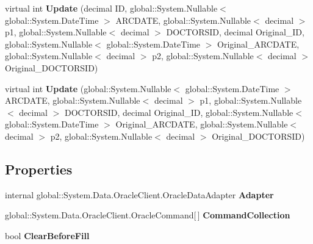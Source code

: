 \begin{CompactItemize}
\item 
virtual int \textbf{Update} (decimal ID, global::System.Nullable$<$ global::System.DateTime $>$ ARCDATE, global::System.Nullable$<$ decimal $>$ p1, global::System.Nullable$<$ decimal $>$ DOCTORSID, decimal Original\_\-ID, global::System.Nullable$<$ global::System.DateTime $>$ Original\_\-ARCDATE, global::System.Nullable$<$ decimal $>$ p2, global::System.Nullable$<$ decimal $>$ Original\_\-DOCTORSID)\label{class_automatic_medical_system_1_1_data_set2_table_adapters_1_1_a_r_c___s_p___d_o_c_t_o_r___r_e_c_o_r_d_s_table_adapter_15d0b9067ab3222469e34572e87bdfb9}

\item 
virtual int \textbf{Update} (global::System.Nullable$<$ global::System.DateTime $>$ ARCDATE, global::System.Nullable$<$ decimal $>$ p1, global::System.Nullable$<$ decimal $>$ DOCTORSID, decimal Original\_\-ID, global::System.Nullable$<$ global::System.DateTime $>$ Original\_\-ARCDATE, global::System.Nullable$<$ decimal $>$ p2, global::System.Nullable$<$ decimal $>$ Original\_\-DOCTORSID)\label{class_automatic_medical_system_1_1_data_set2_table_adapters_1_1_a_r_c___s_p___d_o_c_t_o_r___r_e_c_o_r_d_s_table_adapter_5041dff5a8efb7e228ba881403b568c9}

\end{CompactItemize}
\subsection*{Properties}
\begin{CompactItemize}
\item 
internal global::System.Data.OracleClient.OracleDataAdapter \textbf{Adapter}\hspace{0.3cm}{\tt  [get]}\label{class_automatic_medical_system_1_1_data_set2_table_adapters_1_1_a_r_c___s_p___d_o_c_t_o_r___r_e_c_o_r_d_s_table_adapter_3a68f902971b37bd4df9566218e491a2}

\item 
global::System.Data.OracleClient.OracleCommand[$\,$] \textbf{CommandCollection}\hspace{0.3cm}{\tt  [get]}\label{class_automatic_medical_system_1_1_data_set2_table_adapters_1_1_a_r_c___s_p___d_o_c_t_o_r___r_e_c_o_r_d_s_table_adapter_f54b04de3c8398b34c07c125f11d4425}

\item 
bool \textbf{ClearBeforeFill}\hspace{0.3cm}{\tt  [get, set]}\label{class_automatic_medical_system_1_1_data_set2_table_adapters_1_1_a_r_c___s_p___d_o_c_t_o_r___r_e_c_o_r_d_s_table_adapter_47c85aae0c5ae80ba6002baca2d72863}

\end{CompactItemize}


